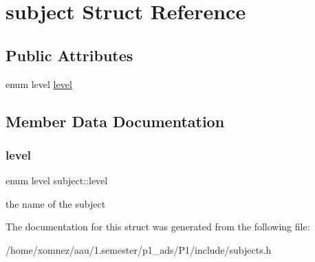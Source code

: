 \hypertarget{structsubject}{}\section{subject Struct Reference}
\label{structsubject}
\subsection*{Public Attributes}
\begin{DoxyCompactItemize}
\item 
enum level \hyperlink{structsubject_a59bfabba13591d841473e9097b309234}{level}
\end{DoxyCompactItemize}


\subsection{Member Data Documentation}
\mbox{\label{structsubject_a59bfabba13591d841473e9097b309234}} 
\subsubsection{\texorpdfstring{level}{level}}
{\footnotesize\ttfamily enum level subject\+::level}

the name of the subject 

The documentation for this struct was generated from the following file\+:\begin{DoxyCompactItemize}
\item 
/home/xomnez/aau/1.\+semester/p1\+\_\+ads/\+P1/include/subjects.\+h\end{DoxyCompactItemize}
